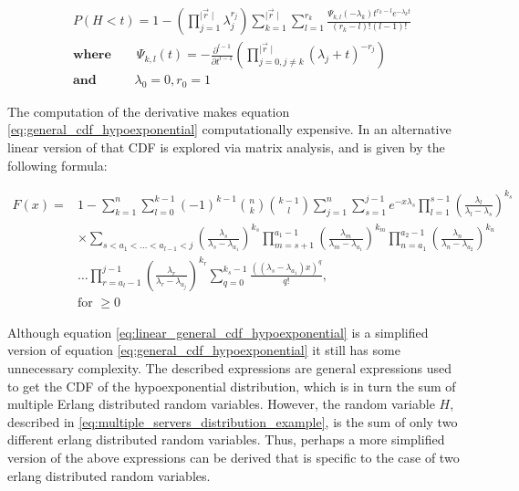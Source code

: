 \begin{align} \label{eq:general_cdf_hypoexponential}
    & P(H < t) = 1 - \left( \prod_{j=1}^{\mid \vec{r} \mid} \lambda_j^{r_j}
    \right) \sum_{k=1}^{\mid \vec{r} \mid} \sum_{l=1}^{r_k}
    \frac{\Psi_{k,l}(-\lambda_k)t^{r_k - l} e^{-\lambda_k t}}
    {(r_k - l)! (l - 1)!} \nonumber \\
    & \textbf{where} \qquad \Psi_{k,l}(t) = - \frac{\partial^{l - 1}}
    {\partial t ^{l - 1}} \left( \prod_{j = 0, j \neq k}^{\mid \vec{r} \mid}
    (\lambda_j + t)^{-r_j} \right) \nonumber \\
    & \textbf{and} \quad \qquad \lambda_0 = 0, r_0 = 1
\end{align}


The computation of the derivative makes equation \ref{eq:general_cdf_hypoexponential}
computationally expensive.
In \cite{Legros2015} an alternative linear version of that CDF is explored via
matrix analysis, and is given by the following formula:

\small
\begin{equation} \label{eq:linear_general_cdf_hypoexponential}
    \begin{split}
        F(x) = &1 - \sum_{k=1}^{n} \sum_{l=0}^{k-1} (-1)^{k-1} \binom{n}{k}
            \binom{k-1}{l} \sum_{j=1}^{n} \sum_{s=1}^{j-1} e^{-x \lambda_s}
            \prod_{l=1}^{s-1} \left( \frac{\lambda_l}{\lambda_l - \lambda_s} \right)
            ^ {k_s} \\
        & \times \sum_{s < a_1 < \dots < a_{l-1} < j}
            \left( \frac{\lambda_s}{\lambda_s - \lambda_{a_1}} \right) ^ {k_s}
            \prod_{m=s+1}^{a_1-1} \left( \frac{\lambda_m}{\lambda_m -
            \lambda_{a_1}}\right) ^ {k_m}
            \prod_{n=a_1}^{a_2-1} \left( \frac{\lambda_n}{\lambda_n -
            \lambda_{a_2}}\right) ^ {k_n} \\
        & \dots \prod_{r=a_l-1}^{j-1} \left( \frac{\lambda_r}{\lambda_r -
            \lambda_{a_j}}\right) ^ {k_r}
            \sum_{q=0}^{k_s - 1} \frac{((\lambda_s - \lambda_{a_1})x)^q}{q!}, \\
        & \text{for } \geq 0
    \end{split}
\end{equation}
\normalsize

Although equation \ref{eq:linear_general_cdf_hypoexponential} is a simplified
version of equation \ref{eq:general_cdf_hypoexponential} it still has some
unnecessary complexity.
The described expressions are general expressions used to get the CDF of
the hypoexponential distribution, which is in turn the sum of multiple
Erlang distributed random variables.
However, the random variable \(H\), described in
\ref{eq:multiple_servers_distribution_example}, is the sum of only two
different erlang distributed random variables.
Thus, perhaps a more simplified version of the above expressions can be derived
that is specific to the case of two erlang distributed random variables.


